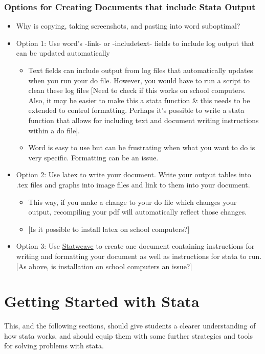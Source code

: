 \documentclass{scrartcl}
\begin{document}
\subsubsection{Options for Creating Documents that include Stata Output}
\begin{itemize}
  \item Why is copying, taking screenshots, and pasting into word suboptimal?
  \item Option 1: Use word's -link- or -includetext- fields to include log output that can be updated automatically
  \begin{itemize}
    \item Text fields can include output from log files that automatically updates when you run your do file. However, you would have to run a script to clean these log files [Need to check if this works on school computers. Also, it may be easier to make this a stata function \& this needs to be extended to control formatting. Perhaps it's possible to write a stata function that allows for including text and document writing instructions within a do file].
    \item Word is easy to use but can be frustrating when what you want to do is very specific. Formatting can be an issue.
  \end{itemize}
  \item Option 2: Use latex to write your document. Write your output tables into .tex files and graphs into image files and link to them into your document.
  \begin{itemize}
    \item This way, if you make a change to your do file which changes your output, recompiling your pdf will automatically reflect those changes.
    \item{[Is it possible to install latex on school computers?]}
  \end{itemize}
  \item Option 3: Use \href{http://homepage.stat.uiowa.edu/~rlenth/StatWeave/}{Statweave} to create one document containing instructions for writing and formatting your document as well as instructions for stata to run. [As above, is installation on school computers an issue?]
\end{itemize}

\section{Getting Started with Stata}
This, and the following sections, should give students a clearer understanding of how stata works, and should equip them with some further strategies and tools for solving problems with stata.
\end{document}

